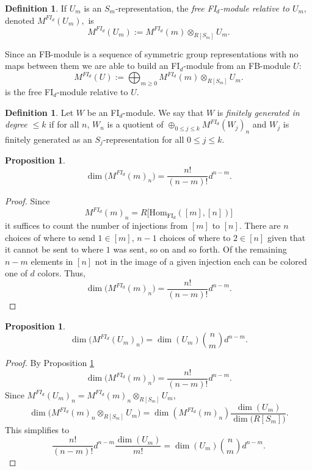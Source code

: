 \documentclass[12py]{amsart}%
\newtheorem{prop}[thm]{Proposition}
\theoremstyle{definition}\newtheorem{definition}[thm]{Definition}
\theoremstyle{definition}
\newtheorem{defn}[thm]{Definition}
\begin{document}
\begin{defn}
If $U_{m}$ is an $S_{m}$-representation, the \emph{free FI$_{d}$-module relative to $U_{m}$}, denoted $M^{FI_{d}}(U_{m}),$ is
\[
M^{FI_{d}}(U_{m}):=M^{FI_{d}}(m)\otimes_{R[S_{m}]}U_{m}.
\]

Since an FB-module is a sequence of symmetric group representations with no maps between them we are able to build an FI$_{d}$-module from an FB-module $U$:
\[
M^{FI_{d}}(U):=\bigoplus_{m\ge 0}M^{FI_{d}}(m)\otimes_{R[S_{m}]}U_{m}.
\]
is the free FI$_{d}$-module relative to $U$.
\end{defn}

\begin{defn}
Let $W$ be an FI$_{d}$-module. We say that $W$ is \emph{finitely generated in degree $\le k$} if for all $n$, $W_{n}$ is a quotient of $\oplus_{0\le j\le k}M^{FI_{d}}(W_{j})_{n}$ and $W_{j}$ is finitely generated as an $S_{j}$-representation for all $0\le j\le k$.
\end{defn}

\begin{prop}\label{dimofsimpleFId}
\[
\dim\big(M^{FI_{d}}(m)_{n}\big)=\frac{n!}{(n-m)!}d^{n-m}.
\]
\end{prop}

\begin{proof}
Since
\[
M^{FI_{d}}(m)_{n}=R\big[\text{Hom}_{\text{FI}_{d}}([m], [n])\big]
\]
it suffices to count the number of injections from $[m]$ to $[n]$. There are $n$ choices of where to send $1\in[m]$, $n-1$ choices of where to $2\in[n]$ given that it cannot be sent to where $1$ was sent, so on and so forth. Of the remaining $n-m$ elements in $[n]$ not in the image of a given injection each can be colored one of $d$ colors. Thus,
\[
\dim\big(M^{FI_{d}}(m)_{n}\big)=\frac{n!}{(n-m)!}d^{n-m}.
\]
\end{proof}

\begin{prop}\label{buidanFIdfromanFB}
\[
\dim\big(M^{FI_{d}}(U_{m})_{n}\big)=\dim(U_{m})\binom{n}{m}d^{n-m}.
\]
\end{prop}

\begin{proof}
By Proposition \ref{dimofsimpleFId} 
\[
\dim(M^{FI_{d}}(m)_{n}\big)=\frac{n!}{(n-m)!}d^{n-m}.
\]
Since $M^{FI_{d}}(U_{m})_{n}=M^{FI_{d}}(m)_{n}\otimes_{R[S_{m}]}U_{m}$,
\[
\dim\big(M^{FI_{d}}(m)_{n}\otimes_{R[S_{m}]}U_{m}\big)=\dim\left(M^{FI_{d}}(m)_{n}\right)\frac{\dim(U_{m})}{\dim\big(R[S_{m}]\big)}.
\]
This simplifies to
\[
\frac{n!}{(n-m)!}d^{n-m}\frac{\dim(U_{m})}{m!}=\dim(U_{m})\binom{n}{m}d^{n-m}.
\]
\end{proof}
\end{document}
